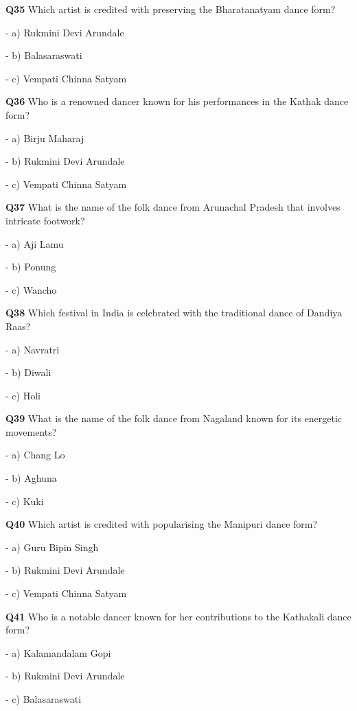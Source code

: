 \textbf{Q35} Which artist is credited with preserving the Bharatanatyam dance form?\par
\quad - a) Rukmini Devi Arundale\par
\quad - b) Balasaraswati\par
\quad - c) Vempati Chinna Satyam\par

\textbf{Q36} Who is a renowned dancer known for his performances in the Kathak dance form?\par
\quad - a) Birju Maharaj\par
\quad - b) Rukmini Devi Arundale\par
\quad - c) Vempati Chinna Satyam\par

\textbf{Q37} What is the name of the folk dance from Arunachal Pradesh that involves intricate footwork?\par
\quad - a) Aji Lamu\par
\quad - b) Ponung\par
\quad - c) Wancho\par

\textbf{Q38} Which festival in India is celebrated with the traditional dance of Dandiya Raas?\par
\quad - a) Navratri\par
\quad - b) Diwali\par
\quad - c) Holi\par

\textbf{Q39} What is the name of the folk dance from Nagaland known for its energetic movements?\par
\quad - a) Chang Lo\par
\quad - b) Aghuna\par
\quad - c) Kuki\par

\textbf{Q40} Which artist is credited with popularising the Manipuri dance form?\par
\quad - a) Guru Bipin Singh\par
\quad - b) Rukmini Devi Arundale\par
\quad - c) Vempati Chinna Satyam\par

\textbf{Q41} Who is a notable dancer known for her contributions to the Kathakali dance form?\par
\quad - a) Kalamandalam Gopi\par
\quad - b) Rukmini Devi Arundale\par
\quad - c) Balasaraswati\par

